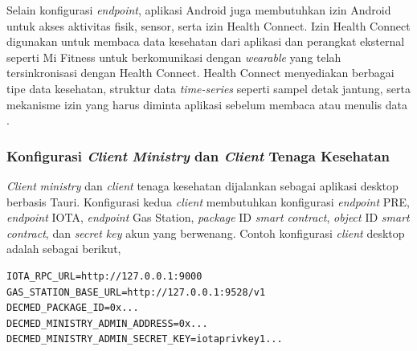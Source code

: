 Selain konfigurasi \textit{endpoint}, aplikasi Android juga membutuhkan izin Android untuk akses aktivitas fisik, sensor, serta izin Health Connect. 
Izin Health Connect digunakan untuk membaca data kesehatan dari aplikasi dan perangkat eksternal seperti Mi Fitness untuk berkomunikasi dengan \textit{wearable} yang telah tersinkronisasi dengan Health Connect. 
Health Connect menyediakan berbagai tipe data kesehatan, struktur data \textit{time-series} seperti sampel detak jantung, serta mekanisme izin yang harus diminta aplikasi sebelum membaca atau menulis data \parencite{android_hc_write}.

\subsubsection{Konfigurasi \textit{Client} \textit{Ministry} dan \textit{Client} Tenaga Kesehatan}

\textit{Client} \textit{ministry} dan \textit{client} tenaga kesehatan dijalankan sebagai aplikasi desktop berbasis Tauri. 
Konfigurasi kedua \textit{client} membutuhkan konfigurasi \textit{endpoint} PRE, \textit{endpoint} IOTA, \textit{endpoint} Gas Station, \textit{package} ID \textit{smart contract}, \textit{object} ID \textit{smart contract}, dan \textit{secret key} akun yang berwenang. 
Contoh konfigurasi \textit{client} desktop adalah sebagai berikut,

\begin{lstlisting}[caption={Konfigurasi \textit{client} desktop DecMed}, label={lst:konfigurasi-client-desktop}, float=htb]
IOTA_RPC_URL=http://127.0.0.1:9000
GAS_STATION_BASE_URL=http://127.0.0.1:9528/v1
DECMED_PACKAGE_ID=0x...
DECMED_MINISTRY_ADMIN_ADDRESS=0x...
DECMED_MINISTRY_ADMIN_SECRET_KEY=iotaprivkey1...
\end{lstlisting}

